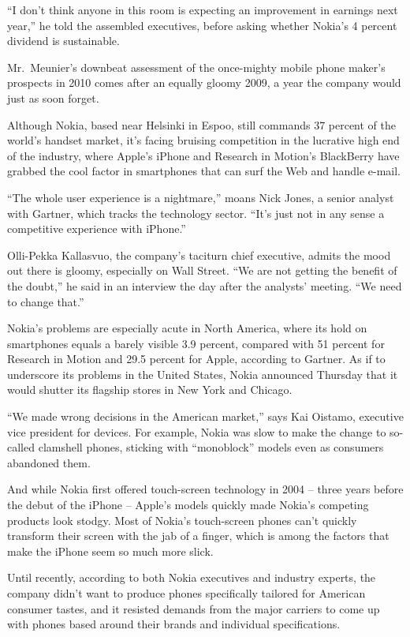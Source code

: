 ﻿\documentclass[12pt]{article}
\begin{document}
``I don't think anyone in this room is expecting an improvement in earnings next year,'' he told the
assembled executives, before asking whether Nokia's 4 percent dividend is sustainable.

Mr.~Meunier's downbeat assessment of the once-mighty mobile phone maker's prospects in 2010 comes
after an equally gloomy 2009, a year the company would just as soon forget.

Although Nokia, based near Helsinki in Espoo, still commands 37 percent of the world's handset
market, it's facing bruising competition in the lucrative high end of the industry, where Apple's
iPhone and Research in Motion's BlackBerry have grabbed the cool factor in smartphones that can surf
the Web and handle e-mail.

``The whole user experience is a nightmare,'' moans Nick Jones, a senior analyst with Gartner, which
tracks the technology sector. ``It's just not in any sense a competitive experience with iPhone.''

Olli-Pekka Kallasvuo, the company's taciturn chief executive, admits the mood out there is gloomy,
especially on Wall Street. ``We are not getting the benefit of the doubt,'' he said in an interview
the day after the analysts' meeting. ``We need to change that.''

Nokia's problems are especially acute in North America, where its hold on smartphones equals a
barely visible 3.9 percent, compared with 51 percent for Research in Motion and 29.5 percent for
Apple, according to Gartner. As if to underscore its problems in the United States, Nokia announced
Thursday that it would shutter its flagship stores in New York and Chicago.

``We made wrong decisions in the American market,'' says Kai Oistamo, executive vice president for
devices. For example, Nokia was slow to make the change to so-called clamshell phones, sticking with
``monoblock'' models even as consumers abandoned them.

And while Nokia first offered touch-screen technology in 2004 -- three years before the debut of the
iPhone -- Apple's models quickly made Nokia's competing products look stodgy. Most of Nokia's
touch-screen phones can't quickly transform their screen with the jab of a finger, which is among
the factors that make the iPhone seem so much more slick.

Until recently, according to both Nokia executives and industry experts, the company didn't want to
produce phones specifically tailored for American consumer tastes, and it resisted demands from the
major carriers to come up with phones based around their brands and individual specifications.
\end{document}
